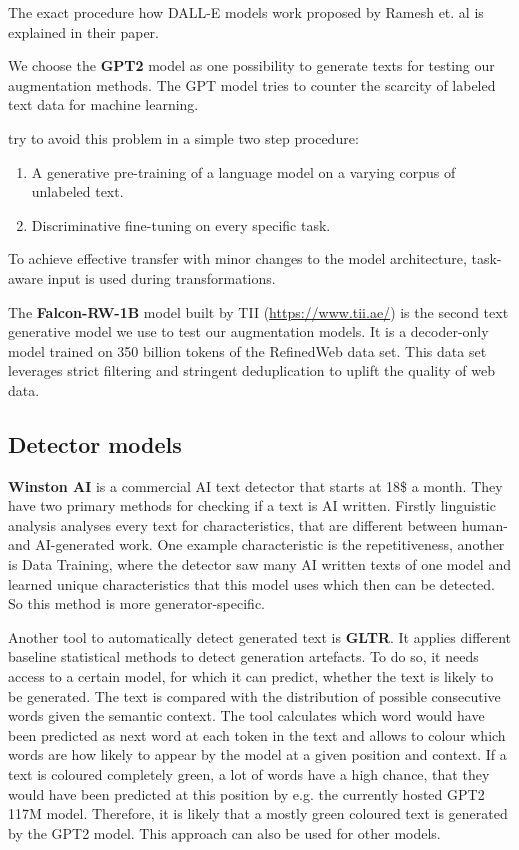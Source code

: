 \documentclass{article} %
\begin{document}
The exact procedure how DALL-E models work proposed by Ramesh et. al is explained in their paper. \cite{ramesh2021zeroshot}

We choose the \textbf{GPT2} model as one possibility to generate texts for testing our augmentation methods. The GPT model tries to counter the scarcity of labeled text data for machine learning.

\cite{radford2018improving} try to avoid this problem in a simple two step procedure:

\begin{enumerate}
	\item A generative pre-training of a language model on a varying corpus of unlabeled text.
	\item Discriminative fine-tuning on every specific task.
\end{enumerate}

To achieve effective transfer with minor changes to the model architecture, task-aware input is used during transformations. \cite{radford2018improving}

The \textbf{Falcon-RW-1B} model built by TII (\url{https://www.tii.ae/}) is the second text generative model we use to test our augmentation models. It is a decoder-only model trained on 350 billion tokens of the RefinedWeb data set. This data set leverages strict filtering and stringent deduplication to uplift the quality of web data. \cite{penedo2023refinedweb}

\subsection{Detector models}

\textbf{Winston AI} is a commercial AI text detector that starts at 18\$ a month. They have two primary methods for checking if a text is AI written. Firstly linguistic analysis analyses every text for characteristics, that are different between human- and AI-generated work. One example characteristic is the repetitiveness, another is Data Training, where the detector saw many AI written texts of one model and learned unique characteristics that this model uses which then can be detected. So this method is more generator-specific. \cite{WinstonAI}

Another tool to automatically detect generated text is \textbf{GLTR}. It applies different baseline statistical methods to detect generation artefacts. To do so, it needs access to a certain model, for which it can predict, whether the text is likely to be generated. The text is compared with the distribution of possible consecutive words given the semantic context. The tool calculates which word would have been predicted as next word at each token in the text and allows to colour which words are how likely to appear by the model at a given position and context. If a text is coloured completely green, a lot of words have a high chance, that they would have been predicted at this position by e.g. the currently hosted GPT2 117M model. Therefore, it is likely that a mostly green coloured text is generated by the GPT2 model. This approach can also be used for other models. \cite{gehrmann2019gltr}
\end{document}
